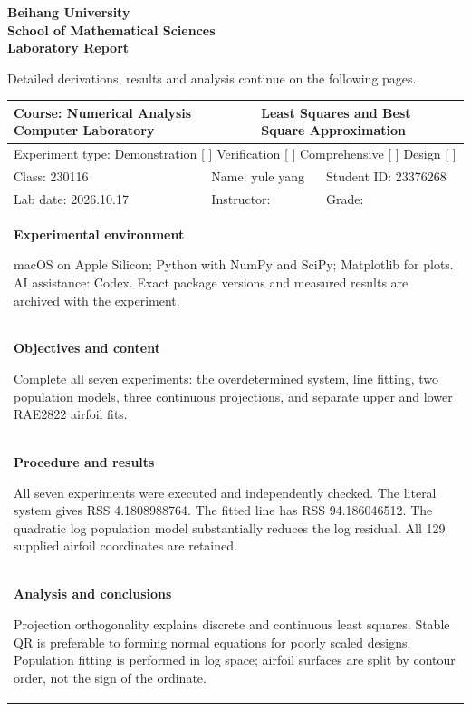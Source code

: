 \documentclass[a4paper,11pt]{article}
\begin{document}
\thispagestyle{empty}
\begin{center}{\Large\bfseries Beihang University\\School of Mathematical Sciences\\Laboratory Report}\end{center}
{\small Detailed derivations, results and analysis continue on the following pages.}\par
\vspace{3mm}
\begin{tabular}{|p{.22\linewidth}|p{.22\linewidth}|p{.22\linewidth}|p{.22\linewidth}|}\hline
\multicolumn{2}{|p{.47\linewidth}|}{Course: Numerical Analysis Computer Laboratory} & \multicolumn{2}{p{.43\linewidth}|}{Least Squares and Best Square Approximation}\\\hline
\multicolumn{4}{|l|}{Experiment type: Demonstration [ ] Verification [ ] Comprehensive [ ] Design [ ]}\\\hline
Class: 230116 & \multicolumn{2}{l|}{Name: yule yang} & Student ID: 23376268\\\hline
Lab date: 2026.10.17 & \multicolumn{2}{l|}{Instructor:} & Grade:\\\hline

\multicolumn{4}{|p{.95\linewidth}|}{\textbf{Experimental environment}\par macOS on Apple Silicon; Python with NumPy and SciPy; Matplotlib for plots. AI assistance: Codex. Exact package versions and measured results are archived with the experiment.\par\vspace{4mm}}\\\hline
\multicolumn{4}{|p{.95\linewidth}|}{\textbf{Objectives and content}\par Complete all seven experiments: the overdetermined system, line fitting, two population models, three continuous projections, and separate upper and lower RAE2822 airfoil fits.\par\vspace{4mm}}\\\hline
\multicolumn{4}{|p{.95\linewidth}|}{\textbf{Procedure and results}\par All seven experiments were executed and independently checked. The literal system gives RSS 4.1808988764. The fitted line has RSS 94.186046512. The quadratic log population model substantially reduces the log residual. All 129 supplied airfoil coordinates are retained.\par\vspace{4mm}}\\\hline
\multicolumn{4}{|p{.95\linewidth}|}{\textbf{Analysis and conclusions}\par Projection orthogonality explains discrete and continuous least squares. Stable QR is preferable to forming normal equations for poorly scaled designs. Population fitting is performed in log space; airfoil surfaces are split by contour order, not the sign of the ordinate.\par\vspace{4mm}}\\\hline
\end{tabular}
\clearpage
\end{document}
